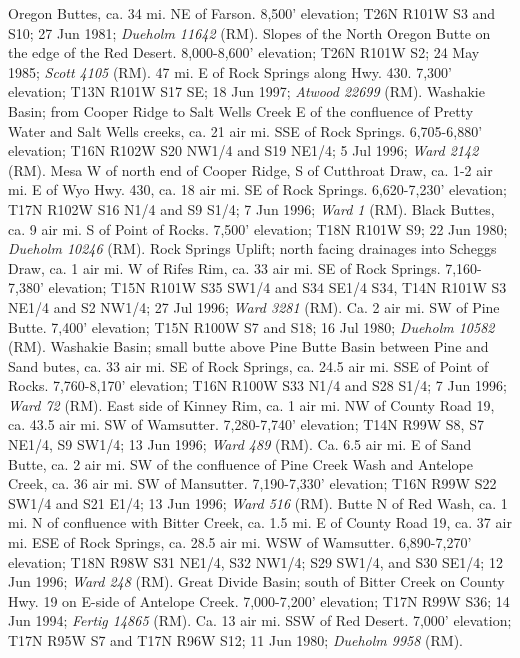 Oregon Buttes, ca. 34 mi. NE of Farson. 8,500' elevation; T26N R101W S3 and S10;
27 Jun 1981; \textit{Dueholm 11642} (RM).
Slopes of the North Oregon Butte on the edge of the Red Desert. 8,000-8,600'
elevation; T26N R101W S2; 24 May 1985; \textit{Scott 4105} (RM).
47 mi. E of Rock Springs along Hwy. 430.	7,300' elevation; T13N R101W S17 SE;
18 Jun 1997; \textit{Atwood 22699} (RM).
Washakie Basin; from Cooper Ridge to Salt Wells Creek E of the confluence of
Pretty Water and Salt Wells creeks, ca. 21 air mi. SSE of Rock Springs.
6,705-6,880' elevation; T16N R102W S20 NW1/4 and S19 NE1/4; 5 Jul 1996;
\textit{Ward 2142} (RM).
Mesa W of north end of Cooper Ridge, S of Cutthroat Draw, ca. 1-2 air mi. E of
Wyo Hwy. 430, ca. 18 air mi. SE of Rock Springs. 6,620-7,230' elevation;
T17N R102W S16 N1/4 and S9 S1/4; 7 Jun 1996; \textit{Ward 1} (RM).
Black Buttes, ca. 9 air mi. S of Point of Rocks. 7,500' elevation; T18N R101W S9;
22 Jun 1980; \textit{Dueholm 10246} (RM).
Rock Springs Uplift; north facing drainages into Scheggs Draw, ca. 1 air mi. W
of Rifes Rim, ca. 33 air mi. SE of Rock Springs. 7,160-7,380' elevation;
T15N R101W S35 SW1/4 and S34 SE1/4 S34, T14N R101W S3 NE1/4 and S2 NW1/4;
27 Jul 1996; \textit{Ward 3281} (RM).
Ca. 2 air mi. SW of Pine Butte. 7,400' elevation; T15N R100W S7 and S18;
16 Jul 1980; \textit{Dueholm 10582} (RM).
Washakie Basin; small butte above Pine Butte Basin between Pine and Sand butes,
ca. 33 air mi. SE of Rock Springs, ca. 24.5 air mi. SSE of Point of Rocks.
7,760-8,170' elevation; T16N R100W S33 N1/4 and S28 S1/4; 7 Jun 1996;
\textit{Ward 72} (RM).
East side of Kinney Rim, ca. 1 air mi. NW of County Road 19, ca.
43.5 air mi. SW of Wamsutter. 7,280-7,740' elevation; T14N R99W S8, S7 NE1/4,
S9 SW1/4; 13 Jun 1996; \textit{Ward 489} (RM).
Ca. 6.5 air mi. E of Sand Butte, ca. 2 air mi. SW of the
confluence of Pine Creek Wash and Antelope Creek, ca. 36 air mi. SW of Mansutter.
7,190-7,330' elevation; T16N R99W S22 SW1/4 and S21 E1/4; 13 Jun 1996;
\textit{Ward 516} (RM).
Butte N of Red Wash, ca. 1 mi. N of confluence with Bitter Creek,
ca. 1.5 mi. E of County Road 19, ca. 37 air mi. ESE of Rock Springs, ca. 28.5
air mi. WSW of Wamsutter. 6,890-7,270' elevation; T18N R98W S31 NE1/4,
S32 NW1/4; S29 SW1/4, and S30 SE1/4; 12 Jun 1996; \textit{Ward 248} (RM).
Great Divide Basin; south of Bitter Creek on County Hwy. 19 on E-side of
Antelope Creek. 7,000-7,200' elevation; T17N R99W S36; 14 Jun 1994;
\textit{Fertig 14865} (RM).
Ca. 13 air mi. SSW of Red Desert. 7,000' elevation; T17N R95W S7 and
T17N R96W S12; 11 Jun 1980; \textit{Dueholm 9958} (RM).
